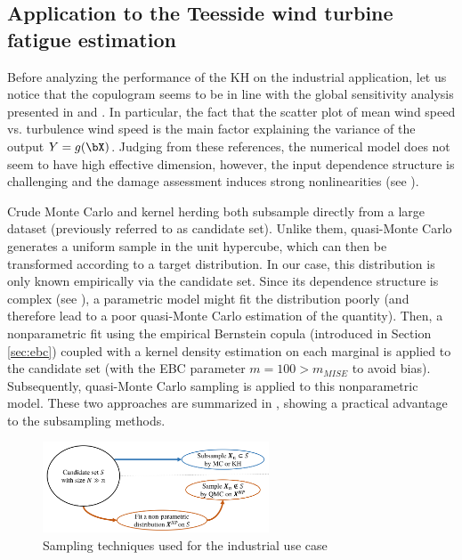 \subsection{Application to the Teesside wind turbine fatigue estimation}

Before analyzing the performance of the KH on the industrial application, let us notice that the copulogram  seems to be in line with the global sensitivity analysis presented in \cite{murcia_dimitrov_2018} and \cite{li_zhan_2020}. 
In particular, the fact that the scatter plot of mean wind speed vs. turbulence wind speed is the main factor explaining the variance of the output $Y=g(\bX)$. 
Judging from these references, the numerical model does not seem to have high effective dimension, however, the input dependence structure is challenging and the damage assessment induces strong nonlinearities (see ). 

Crude Monte Carlo and kernel herding both subsample directly from a large dataset (previously referred to as candidate set). 
Unlike them, quasi-Monte Carlo generates a uniform sample in the unit hypercube, which can then be transformed according to a target distribution. 
In our case, this distribution is only known empirically via the candidate set. 
Since its dependence structure is complex (see ), a parametric model might fit the distribution poorly (and therefore lead to a poor quasi-Monte Carlo estimation of the quantity). 
Then, a nonparametric fit using the empirical Bernstein copula (introduced in Section \ref{sec:ebc}) coupled with a kernel density estimation on each marginal is applied to the candidate set (with the EBC parameter $m=100 > m_{MISE}$ to avoid bias). 
Subsequently, quasi-Monte Carlo sampling is applied to this nonparametric model. 
These two approaches are summarized in , showing a practical advantage to the subsampling methods.

\begin{figure}[!h]
    \centering
    \includegraphics[width=0.6\textwidth]{part2/figures/DCE/diagram_samplings.pdf}
    \caption{Sampling techniques used for the industrial use case}
    \label{fig:sampling_diagram}
\end{figure}

